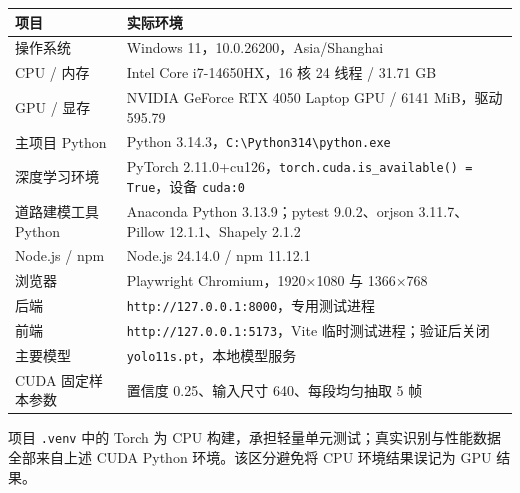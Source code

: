 \begin{longtable}[]{@{}
  >{\raggedright\arraybackslash}p{}
  >{\raggedright\arraybackslash}p{}@{}}
\toprule\noalign{}
\begin{minipage}[b]{\linewidth}\raggedright
项目
\end{minipage} & \begin{minipage}[b]{\linewidth}\raggedright
实际环境
\end{minipage} \\
\midrule\noalign{}
\endhead
\bottomrule\noalign{}
\endlastfoot
操作系统 & Windows 11，10.0.26200，Asia/Shanghai \\
CPU / 内存 & Intel Core i7-14650HX，16 核 24 线程 / 31.71 GB \\
GPU / 显存 & NVIDIA GeForce RTX 4050 Laptop GPU / 6141 MiB，驱动 595.79 \\
主项目 Python & Python 3.14.3，\texttt{C:\allowbreak{}\textbackslash{}\allowbreak{}\allowbreak{}Python314\textbackslash{}\allowbreak{}python.\allowbreak{}exe} \\
深度学习环境 & PyTorch 2.11.0+cu126，\texttt{torch.\allowbreak{}cuda.\allowbreak{}is\_\allowbreak{}available() = \allowbreak{}True}，设备 \texttt{cuda:\allowbreak{}0} \\
道路建模工具 Python & Anaconda Python 3.13.9；pytest 9.0.2、orjson 3.11.7、Pillow 12.1.1、Shapely 2.1.2 \\
Node.js / npm & Node.js 24.14.0 / npm 11.12.1 \\
浏览器 & Playwright Chromium，1920×1080 与 1366×768 \\
后端 & \texttt{http:\allowbreak{}/\allowbreak{}/\allowbreak{}127.\allowbreak{}0.\allowbreak{}0.\allowbreak{}1:\allowbreak{}8000}，专用测试进程 \\
前端 & \texttt{http:\allowbreak{}/\allowbreak{}/\allowbreak{}127.\allowbreak{}0.\allowbreak{}0.\allowbreak{}1:\allowbreak{}5173}，Vite 临时测试进程；验证后关闭 \\
主要模型 & \texttt{yolo11s.\allowbreak{}pt}，本地模型服务 \\
CUDA 固定样本参数 & 置信度 0.25、输入尺寸 640、每段均匀抽取 5 帧 \\
\end{longtable}

项目 \texttt{.\allowbreak{}venv} 中的 Torch 为 CPU 构建，承担轻量单元测试；真实识别与性能数据全部来自上述 CUDA Python 环境。该区分避免将 CPU 环境结果误记为 GPU 结果。

